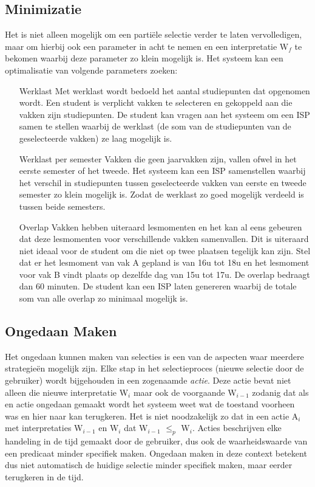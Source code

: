 \subsection{Minimizatie}
Het is niet alleen mogelijk om een parti\"{e}le selectie verder te laten vervolledigen, maar om hierbij ook een parameter in acht te nemen en een interpretatie W$_{f}$ te bekomen waarbij deze parameter zo klein mogelijk is. Het systeem kan een optimalisatie van volgende parameters zoeken:
\begin{itemize}
\item[Werklast] Met werklast wordt bedoeld het aantal studiepunten dat opgenomen wordt. Een student is verplicht vakken te selecteren en gekoppeld aan die vakken zijn studiepunten. De student kan vragen aan het systeem om een ISP samen te stellen waarbij de werklast (de som van de studiepunten van de geselecteerde vakken) ze laag mogelijk is.
\item[Werklast per semester] Vakken die geen jaarvakken zijn, vallen ofwel in het eerste semester of het tweede. Het systeem kan een ISP samenstellen waarbij het verschil in studiepunten tussen geselecteerde vakken van eerste en tweede semester zo klein mogelijk is. Zodat de werklast zo goed mogelijk verdeeld is tussen beide semesters.
\item[Overlap] Vakken hebben uiteraard lesmomenten en het kan al eens gebeuren dat deze lesmomenten voor verschillende vakken samenvallen. Dit is uiteraard niet ideaal voor de student om die niet op twee plaatsen tegelijk kan zijn. Stel dat er het lesmoment van vak A gepland is van 16u tot 18u en het lesmoment voor vak B vindt plaats op dezelfde dag van 15u tot 17u. De overlap bedraagt dan 60 minuten. De student kan een ISP laten genereren waarbij de totale som van alle overlap zo minimaal mogelijk is. 
\end{itemize}

\subsection{Ongedaan Maken}
Het ongedaan kunnen maken van selecties is een van de aspecten waar meerdere strategie\"{e}n mogelijk zijn. Elke stap in het selectieproces (nieuwe selectie door de gebruiker) wordt bijgehouden in een zogenaamde \textit{actie}. Deze actie bevat niet alleen die nieuwe interpretatie W$_{i}$ maar ook de voorgaande W$_{i-1}$ zodanig dat als en actie ongedaan gemaakt wordt het systeem weet wat de toestand voorheen was en hier naar kan terugkeren. Het is niet noodzakelijk zo dat in een actie A$_{i}$ met interpretaties W$_{i-1}$ en W$_{i}$ dat W$_{i-1}$ $\leq_{p}$ W$_{i}$. Acties beschrijven elke handeling in de tijd gemaakt door de gebruiker, dus ook de waarheidswaarde van een predicaat minder specifiek maken. Ongedaan maken in deze context betekent dus niet automatisch de huidige selectie minder specifiek maken, maar eerder terugkeren in de tijd.

